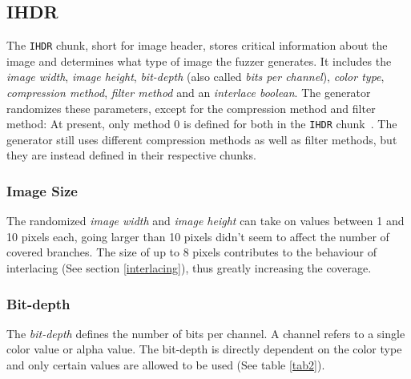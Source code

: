 \documentclass[runningheads]{llncs}
\begin{document}
\subsection{IHDR}
The \texttt{IHDR} chunk, short for image header, stores critical information about the image and determines what type of image the fuzzer generates.
It includes the \textit{image width}, \textit{image height}, \textit{bit-depth} (also called \textit{bits per channel}), \textit{color type}, \textit{compression method}, \textit{filter method} and an \textit{interlace boolean}.
The generator randomizes these parameters, except for the compression method and filter method: At present, only method 0 is defined for both in the \texttt{IHDR} chunk~\cite{libpng_chunks}. The generator still uses different compression methods as well as filter methods, but they are instead defined in their respective chunks.

\subsubsection{Image Size}
The randomized \textit{image width} and \textit{image height} can take on values between 1 and 10 pixels each, going larger than 10 pixels didn't seem to affect the number of covered branches. 
The size of up to 8 pixels contributes to the behaviour of interlacing (See section \ref{interlacing}), thus greatly increasing the coverage.

\subsubsection{Bit-depth}
The \textit{bit-depth} defines the number of bits per channel. A channel refers to a single color value or alpha value.
The bit-depth is directly dependent on the color type and only certain values are allowed to be used (See table \ref{tab2}).
\end{document}
